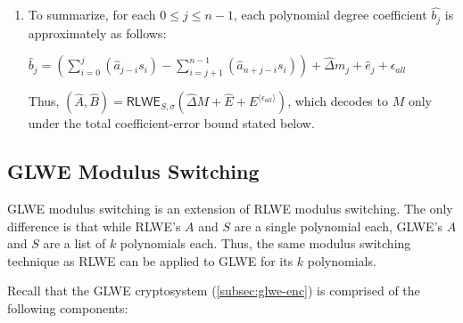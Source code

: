 \begin{enumerate}
$=  \left(\sum\limits_{i=0}^{j}(\hat{a}_{j-i}s_i) 
- \sum\limits_{i=j+1}^{n-1}(\hat{a}_{n+j-i}s_i)\right)
+ \hat{\Delta} m_j + \hat{e}_j 
+ \left(\epsilon_{b_j} - \epsilon_{e_j}
- \sum\limits_{i=0}^{j}(\epsilon_{a_{j-i}} s_i)
+ \sum\limits_{i=j+1}^{n-1}(\epsilon_{a_{n+j-i}} s_i)\right) + \hat{q} \cdot c_j
$

$=  \left(\sum\limits_{i=0}^{j}(\hat{a}_{j-i}s_i) 
- \sum\limits_{i=j+1}^{n-1}(\hat{a}_{n+j-i}s_i)\right)
+ \hat{\Delta} m_j + \hat{e}_j 
+ \epsilon_{\textit{all}} \in \mathbb{Z}_{\hat{q}}
$

\textcolor{red}{ $\rhd$ where $\epsilon_{\textit{all}} = \epsilon_{b_j} - \epsilon_{e_j}
- \sum\limits_{i=0}^{j}(\epsilon_{a_{j-i}} s_i)
+ \sum\limits_{i=j+1}^{n-1}(\epsilon_{a_{n+j-i}} s_i)$}


$ $

\item To summarize, for each $0 \leq j \leq n-1 $, each polynomial degree coefficient $\hat{b_j}$ is approximately as follows:

$\hat{b}_j =  \left(\sum\limits_{i=0}^{j}(\hat{a}_{j-i}s_i) 
- \sum\limits_{i=j+1}^{n-1}(\hat{a}_{n+j-i}s_i)\right)
+ \hat{\Delta} m_j + \hat{e}_j 
+ \epsilon_{\textit{all}}$



Thus, $(\hat{A}, \hat{B}) = \textsf{RLWE}_{{S},\sigma}(\hat{\Delta} M + \hat{E} + E^{\langle \epsilon_{\textit{all}} \rangle})$, which decodes to $M$ only under the total coefficient-error bound stated below.

\begin{flushright}
\qedsymbol{} 
\end{flushright}

\end{enumerate}




\subsection{GLWE Modulus Switching}
\label{subsec:modulus-switch-glwe}

GLWE modulus switching is an extension of RLWE modulus switching. The only difference is that while RLWE's $A$ and $S$ are a single polynomial each, GLWE's $A$ and $S$ are a list of $k$ polynomials each. Thus, the same modulus switching technique as RLWE can be applied to GLWE for its $k$ polynomials.  

Recall that the GLWE cryptosystem (\autoref{subsec:glwe-enc}) is comprised of the following components:

